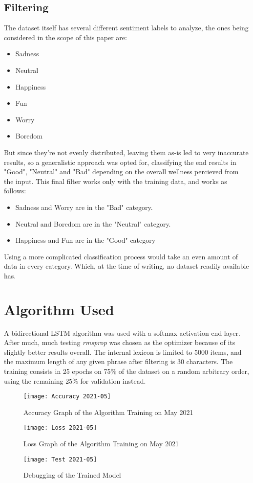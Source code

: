 \subsection{Filtering}
The dataset itself has several different sentiment labels to analyze, the ones being considered in the scope of this paper are:
\begin{itemize}
	\item Sadness
	\item Neutral
	\item Happiness
	\item Fun
	\item Worry
	\item Boredom
\end{itemize}
But since they're not evenly distributed, leaving them as-is led to very inaccurate results, so a generalistic approach was opted for, classifying the end results in "Good", "Neutral" and "Bad" depending on the overall wellness percieved from the input.
This final filter works only with the training data, and works as follows:
\begin{itemize}
	\item Sadness and Worry are in the "Bad" category.
	\item Neutral and Boredom are in the "Neutral" category.
	\item Happiness and Fun are in the "Good" category
\end{itemize}
Using a more complicated classification process would take an even amount of data in every category. Which, at the time of writing, no dataset readily available has.

\section{Algorithm Used}
A bidirectional LSTM algorithm was used with a softmax activation end layer. After much, much testing \textit{rmsprop} was chosen as the optimizer because of its slightly better results overall.
The internal lexicon is limited to 5000 items, and the maximum length of any given phrase after filtering is 30 characters.
The training consists in 25 epochs on 75\% of the dataset on a random arbitrary order, using the remaining 25\% for validation instead.
\begin{figure}[!h]
	\centering
	\texttt{[image: Accuracy 2021-05]}
	\caption{Accuracy Graph of the Algorithm Training on May 2021}
	\label{fig:accuracy2021}
	\texttt{[image: Loss 2021-05]}
	\caption{Loss Graph of the Algorithm Training on May 2021}
	\label{fig:loss2021}
\end{figure}
\begin{figure}[!h]
	\centering
	\texttt{[image: Test 2021-05]}
	\caption{Debugging of the Trained Model}
	\label{fig:test}
\end{figure}
\pagebreak

